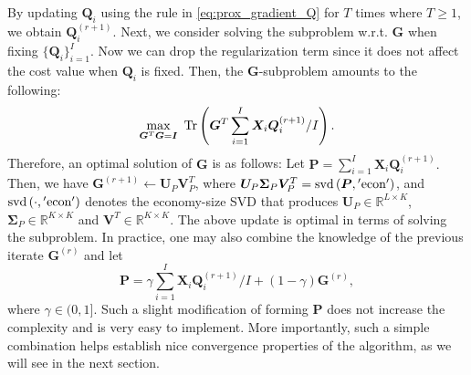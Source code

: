 \documentclass[10pt,journal]{IEEEtran}
\newtheorem{Remark}{Remark}
\newcommand{\G}{\boldsymbol{G}}
\newcommand{\Q}{\boldsymbol{Q}}
\begin{document}
By updating $\Q_i$ using the rule in \eqref{eq:prox_gradient_Q} for $T$ times where $T\geq 1$, we obtain
$\Q_i^{(r+1)}$.
Next, we consider solving the subproblem w.r.t. ${\bm G}$ when fixing $\{{\bm Q}_i\}_{i=1}^I$.
Now we can drop the regularization term since it does not affect the cost value when $\Q_i$ is fixed.
Then, the $\G$-subproblem amounts to the following:
\begin{align*}
\max_{{\bm G}^T{\bm G}={\bm I}}~{\rm Tr}\left({\bm G}^T\sum_{i=1}^I{\bm X}_i{\bm Q}_i^{(r+1)}/I\right). \label{eq:G_sln}
\end{align*}
Therefore, an optimal solution of ${\bm G}$ is as follows:
Let ${\bm P}=\sum_{i=1}^I{\bm X}_i{\bm Q}_i^{(r+1)}.$
Then, we have 
${\bm G}^{(r+1)} \leftarrow {\bm U}_P{\bm V}^T_P$,
where ${\bm U}_P{\bm \Sigma}_P{\bm V}^T_P = {\rm svd}\left({\bm P},{\rm 'econ'}\right)$,
and ${\rm svd}\left(\cdot,{\rm 'econ'}\right)$ denotes the economy-size SVD that produces ${\bm U}_P\in\mathbb{R}^{L\times K}$,
${\bm \Sigma}_P\in\mathbb{R}^{K\times K}$ and ${\bm V}^T\in\mathbb{R}^{K\times K}$.
The above update is optimal in terms of solving the subproblem. In practice, one may also combine the knowledge of the previous iterate $\G^{(r)}$ and let
\begin{equation}
 {\bm P}=\gamma\sum_{i=1}^I{\bm X}_i{\bm Q}_i^{(r+1)}/I + (1-\gamma)\G^{(r)}, 
\end{equation}
where $\gamma\in(0,1]$. 
Such a slight modification of forming ${\bm P}$ does not increase the complexity and is very easy to implement.
More importantly, such a simple combination helps establish nice convergence properties of the algorithm, as we will see in the next section.




\end{document}
